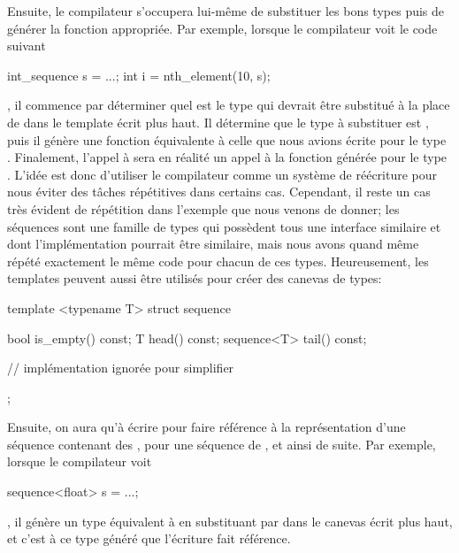 Ensuite, le compilateur s'occupera lui-même de substituer les bons types puis
de générer la fonction appropriée. Par exemple, lorsque le compilateur voit le
code suivant
\begin{cpp}
    int_sequence s = ...;
    int i = nth_element(10, s);
\end{cpp}

, il commence par déterminer quel est le type qui devrait être substitué à
la place de  dans le template écrit plus haut. Il détermine
que le type à substituer est , puis il génère une fonction
équivalente à celle que nous avions écrite pour le type .
Finalement, l'appel à  sera en réalité un appel à la
fonction générée pour le type . L'idée est donc
d'utiliser le compilateur comme un système de réécriture pour nous
éviter des tâches répétitives dans certains cas. Cependant, il reste un cas
très évident de répétition dans l'exemple que nous venons de donner; les
séquences sont une famille de types qui possèdent tous une interface similaire
et dont l'implémentation pourrait être similaire, mais nous avons quand même
répété exactement le même code pour chacun de ces types. Heureusement, les
templates peuvent aussi être utilisés pour créer des canevas de types:
\begin{cpp}
    template <typename T>
    struct sequence {
        bool is_empty() const;
        T head() const;
        sequence<T> tail() const;

        // implémentation ignorée pour simplifier
    };
\end{cpp}

Ensuite, on aura qu'à écrire  pour faire référence à la
représentation d'une séquence contenant des , 
pour une séquence de , et ainsi de suite. Par exemple, lorsque le
compilateur voit
\begin{cpp}
    sequence<float> s = ...;
\end{cpp}

, il génère un type équivalent à  en substituant 
par  dans le canevas écrit plus haut, et c'est à ce type généré que
l'écriture  fait référence.

